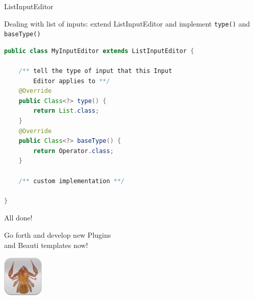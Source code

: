 \documentclass{beamer}
\theoremstyle{definition}
\begin{document}
\begin{frame}[containsverbatim]{ListInputEditor}

Dealing with list of inputs: extend ListInputEditor
and implement {\tt type()} and {\tt baseType()}

\begin{lstlisting}[language=java]
public class MyInputEditor extends ListInputEditor {

    /** tell the type of input that this Input 
        Editor applies to **/
	@Override
	public Class<?> type() {
		return List.class;
	}
	@Override
	public Class<?> baseType() {
		return Operator.class;
	}

    /** custom implementation **/

} 
\end{lstlisting}

\end{frame}


\begin{frame}[containsverbatim]{All done!}

Go forth and develop new Plugins \\and Beauti templates now!\vskip1cm

\begin{center}
\includegraphics{../../src/beast/app/draw/icons/beast.png}
\end{center}
\end{frame}
\end{document}
